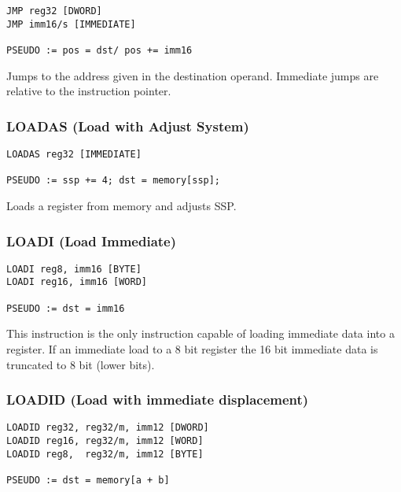 \begin{verbatim}
JMP reg32 [DWORD]
JMP imm16/s [IMMEDIATE]

PSEUDO := pos = dst/ pos += imm16
\end{verbatim}


Jumps to the address given in the destination operand. Immediate jumps are relative to the instruction pointer.

\subsubsection{LOADAS (Load with Adjust System)}

\begin{verbatim}
LOADAS reg32 [IMMEDIATE]

PSEUDO := ssp += 4; dst = memory[ssp];
\end{verbatim}


Loads a register from memory and adjusts SSP.

\subsubsection{LOADI (Load Immediate)}

\begin{verbatim}
LOADI reg8, imm16 [BYTE]
LOADI reg16, imm16 [WORD]

PSEUDO := dst = imm16
\end{verbatim}


This instruction is the only instruction capable of loading immediate data into a register. If an immediate load to
a 8 bit register the 16 bit immediate data is truncated to 8 bit (lower bits).

\subsubsection{LOADID (Load with immediate displacement)}

\begin{verbatim}
LOADID reg32, reg32/m, imm12 [DWORD]
LOADID reg16, reg32/m, imm12 [WORD]
LOADID reg8,  reg32/m, imm12 [BYTE] 

PSEUDO := dst = memory[a + b]
\end{verbatim}


